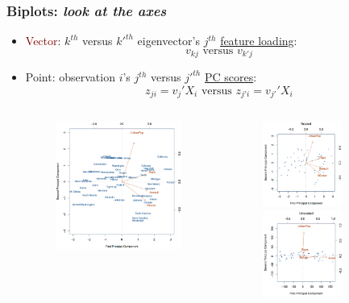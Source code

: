 \documentclass[xcolor={dvipsnames}]{beamer}
\begin{document}
\frame
{
 \frametitle{Biplots: \emph{look at the axes}}

\begin{itemize}
\item \textcolor{Maroon}{Vector}: $k^{th}$ versus $k'^{th}$ eigenvector's $j^{th}$ \underline{feature loading}: $$v_{kj} \text{ versus }v_{k'j}$$
\item \textcolor{NavyBlue}{Point}: observation $i$'s $j^{th}$ versus $j'^{th}$  \underline{PC scores}: $$z_{ji} = v_{j}'X_{i} \text{ versus } z_{j'i} = v_{j'}'X_{i}$$
\end{itemize}

\vspace{-3em}

\begin{columns}
\begin{column}{.01\textwidth}
\end{column}
\begin{column}{.4\textwidth}
\begin{figure}
\centering
\includegraphics[width=2.25in]{stuff/biplot.png}
\end{figure}

\end{column}
\begin{column}{.4\textwidth}

\begin{figure}

\vspace{.4em}

\includegraphics[width=1.03in]{stuff/biplot2b.png}

\includegraphics[width=1.03in]{stuff/biplot2.png}
\end{figure}

\end{column}

\end{columns}

}
\end{document}
